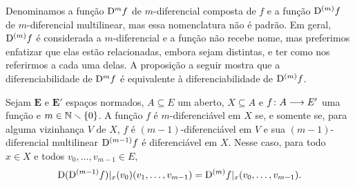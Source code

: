 Denominamos a função $\mathrm{D}^m f$ de $m$-diferencial composta de $f$ e a função $\mathrm{D}^{(m)} f$ de $m$-diferencial multilinear, mas essa nomenclatura não é padrão. Em geral, $\mathrm{D}^{(m)} f$ é considerada a $m$-diferencial e a função não recebe nome, mas preferimos enfatizar que elas estão relacionadas, embora sejam distintas, e ter como nos referirmos a cada uma delas. A proposição a seguir mostra que a diferenciabilidade de $\mathrm{D}^m f$ é equivalente à diferenciabilidade de $\mathrm{D}^{(m)} f$.

\begin{proposition}
\label{prop:multidiferencial.multilinear}
Sejam $\bm E$ e $\bm E'$ espaços normados, $A \subseteq E$ um aberto, $X \subseteq A$ e $f\colon \allowbreak A \longrightarrow E'$ uma função e $m \in \mathbb{N} \smallsetminus \{0\}$. A função $f$ é $m$-diferenciável em $X$ se, e somente se, para alguma vizinhança $V$ de $X$, $f$ é $(m-1)$-diferenciável em $V$ e sua $(m-1)$-diferencial multilinear $\mathrm{D}^{(m-1)} f$ é diferenciável em $X$. Nesse caso, para todo $x \in X$ e todos $v_0, \ldots, v_{m-1} \in E$,
	\begin{equation*}
	\mathrm{D} (\mathrm{D}^{(m-1)} f)|_x (v_0)(v_1,\ldots, v_{m-1}) = \mathrm{D}^{(m)} f|_x(v_0,\ldots, v_{m-1}).
	\end{equation*}
\end{proposition}
